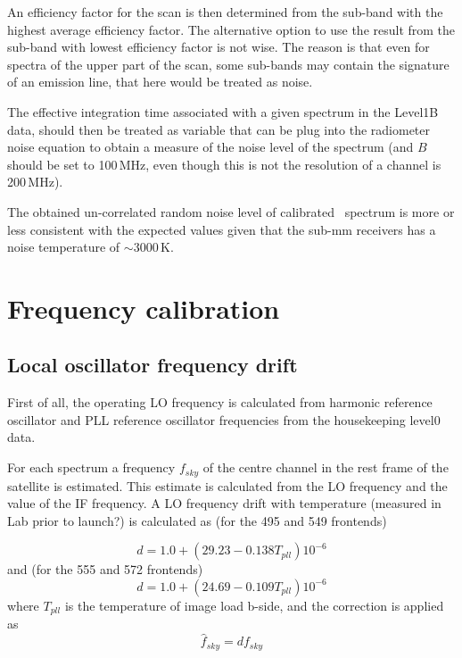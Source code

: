 An efficiency factor for the scan is then determined from the sub-band
with the highest average efficiency factor. The alternative option
to use the result from the sub-band with lowest efficiency factor
is not wise. The reason is that even for spectra of the upper part
of the scan, some sub-bands may contain the signature of an emission 
line, that here would be treated as noise.

The effective integration time associated with a given spectrum
in the Level1B data, should then be treated as 
variable that can be plug into the radiometer noise equation
to obtain a measure of the noise level of the spectrum
(and \(B\) should be set to 100\,MHz, even though this is not
the resolution of a channel is 200\,MHz).

The obtained un-correlated random noise level of calibrated \smr\
spectrum is more or less consistent with the expected values
given that the sub-mm receivers has a noise temperature
of \(\sim\)3000\,K.	    


\section{Frequency calibration}

\subsection{Local oscillator frequency drift}

First of all, the operating LO frequency is calculated
from harmonic reference oscillator and PLL reference oscillator 
frequencies from the housekeeping level0 data.

For each spectrum a frequency \(f_{sky}\) of the centre channel in 
the rest frame of the satellite is estimated.
This estimate is calculated from the LO frequency and the 
value of the IF frequency.
A LO frequency drift with temperature (measured in Lab prior to launch?) 
is calculated as (for the 495 and 549 frontends)

\begin{equation}
  d = 1.0+(29.23-0.138T_{pll})10^{-6}
\end{equation}
and (for the 555 and 572 frontends)
\begin{equation}
  d = 1.0+(24.69-0.109T_{pll})10^{-6}
\end{equation}
where \(T_{pll}\) is the temperature of image load b-side,
and the correction is applied as
\begin{equation}
 \hat{f}_{sky}= d f_{sky}
\end{equation}

